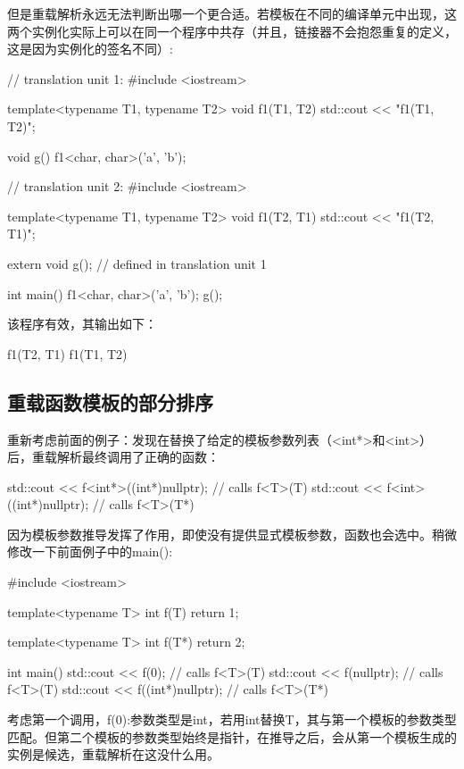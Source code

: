 但是重载解析永远无法判断出哪一个更合适。若模板在不同的编译单元中出现，这两个实例化实际上可以在同一个程序中共存（并且，链接器不会抱怨重复的定义，这是因为实例化的签名不同）:

\begin{cpp}
// translation unit 1:
#include <iostream>

template<typename T1, typename T2>
void f1(T1, T2) {
	std::cout << "f1(T1, T2)\n";
}

void g() {
	f1<char, char>('a', 'b');
}

// translation unit 2:
#include <iostream>

template<typename T1, typename T2>
void f1(T2, T1) {
	std::cout << "f1(T2, T1)\n";
}

extern void g(); // defined in translation unit 1

int main() {
	f1<char, char>('a', 'b');
	g();
}
\end{cpp}

该程序有效，其输出如下：

\begin{shell}
f1(T2, T1)
f1(T1, T2)
\end{shell}

\subsection{重载函数模板的部分排序}

重新考虑前面的例子：发现在替换了给定的模板参数列表（<int*>和<int>）后，重载解析最终调用了正确的函数：

\begin{shell}
std::cout << f<int*>((int*)nullptr); // calls f<T>(T)
std::cout << f<int>((int*)nullptr); // calls f<T>(T*)
\end{shell}

因为模板参数推导发挥了作用，即使没有提供显式模板参数，函数也会选中。稍微修改一下前面例子中的main():

\begin{cpp}
#include <iostream>

template<typename T>
int f(T) {
	return 1;
}

template<typename T>
int f(T*) {
	return 2;
}

int main() {
	std::cout << f(0); // calls f<T>(T)
	std::cout << f(nullptr); // calls f<T>(T)
	std::cout << f((int*)nullptr); // calls f<T>(T*)
}
\end{cpp}

考虑第一个调用，f(0):参数类型是int，若用int替换T，其与第一个模板的参数类型匹配。但第二个模板的参数类型始终是指针，在推导之后，会从第一个模板生成的实例是候选，重载解析在这没什么用。

